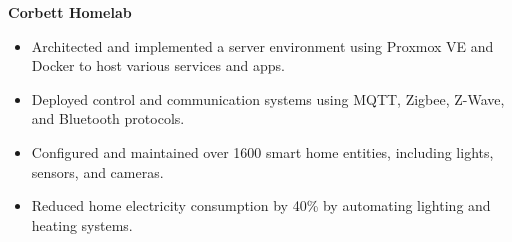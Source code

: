 \textbf{{Corbett Homelab} \hfill} \par
\begin{itemize}
	\item Architected and implemented a server environment using Proxmox VE and Docker to host various services and apps.
    \item Deployed control and communication systems using MQTT, Zigbee, Z-Wave, and Bluetooth protocols.
    \item Configured and maintained over 1600 smart home entities, including lights, sensors, and cameras.
    \item Reduced home electricity consumption by 40\% by automating lighting and heating systems.
\end{itemize}\vspace{0.1cm}\par